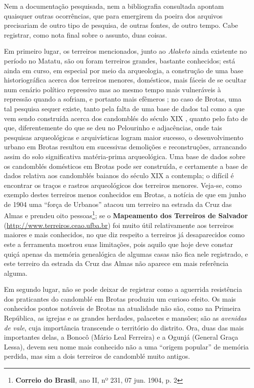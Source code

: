 Nem a documentação pesquisada, nem a bibliografia consultada apontam quaisquer outras ocorrências, que para emergirem da poeira dos arquivos precisariam de outro tipo de pesquisa, de outras fontes, de outro tempo. Cabe registrar, como nota final sobre o assunto, duas coisas. 

Em primeiro lugar, os terreiros mencionados, junto ao \textit{Alaketo} ainda existente no período no Matatu, são ou foram terreiros grandes, bastante conhecidos; está ainda em curso, em especial por meio da arqueologia, a construção de uma base historiográfica acerca dos terreiros menores, domésticos, mais fáceis de se ocultar num cenário político repressivo mas ao mesmo tempo mais vulneráveis à repressão quando a sofriam, e portanto mais efêmeros \cite{gordenstein_arqueterre_2016}; no caso de Brotas, uma tal pesquisa sequer existe, tanto pela falta de uma base de dados tal como a que vem sendo construída acerca dos candomblés do século XIX \cite{reis_candomble_2001}, quanto pelo fato de que, diferentemente do que se deu no Pelourinho e adjacências, onde tais pesquisas arqueológicas e arquivísticas logram maior sucesso, o desenvolvimento urbano em Brotas resultou em sucessivas demolições e reconstruções, arrancando assim do solo significativa matéria-prima arqueológica. Uma base de dados sobre os candomblés domésticos em Brotas pode ser construída, e certamente a base de dados relativa aos candomblés baianos do século XIX a contempla; o difícil é encontrar os traços e rastros arqueológicos dos terreiros menores. Veja-se, como exemplo destes terreiros menos conhecidos em Brotas, a notícia de que em junho de 1904 uma ``força de Urbanos'' atacou um terreiro na estrada da Cruz das Almas e prendeu oito pessoas\footnote{\textbf{Correio do Brasil}, ano II, nº 231, 07 jun. 1904, p. 2}; se o \textbf{Mapeamento dos Terreiros de Salvador} (\url{http://www.terreiros.ceao.ufba.br}) foi muito útil relativamente aos terreiros maiores e mais conhecidos, no que diz respeito a terreiros já desaparecidos como este a ferramenta mostrou suas limitações, pois aquilo que hoje deve constar quiçá apenas da memória genealógica de algumas casas não fica nele registrado, e este terreiro da estrada da Cruz das Almas não aparece em mais referência alguma. 

Em segundo lugar, não se pode deixar de registrar como a aguerrida resistência dos praticantes do candomblé em Brotas produziu um curioso efeito. Os mais conhecidos pontos notáveis de Brotas na atualidade não são, como na Primeira República, as igrejas e as grandes herdades, palacetes e mansões; são as \textit{avenidas de vale}, cuja importância transcende o território do distrito. Ora, duas das mais importantes delas, a Bonocô (Mário Leal Ferreira) e a Ogunjá (General Graça Lessa), devem seu nome mais conhecido não a uma ``origem popular'' de memória perdida, mas sim a dois terreiros de candomblé muito antigos. 


